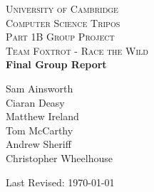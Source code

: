 \begin{titlepage}
\begin{center}


\textsc{\LARGE University of Cambridge}\\[3.5cm]

\textsc{\Large Computer Science Tripos \\[2mm] Part 1B Group Project}\\[0.4cm]
\textsc{\Large Team Foxtrot - Race the Wild}\\[2cm]


{ \huge \bfseries \vspace{3.5mm} Final Group Report }\\[2cm]


\begin{center}
\large
Sam Ainsworth\\
Ciaran Deasy\\
Matthew Ireland\\
Tom McCarthy\\
Andrew Sheriff\\
Christopher Wheelhouse\\
\end{center}

\vfill

{\large Last Revised: \today}
\end{center}
\end{titlepage}

